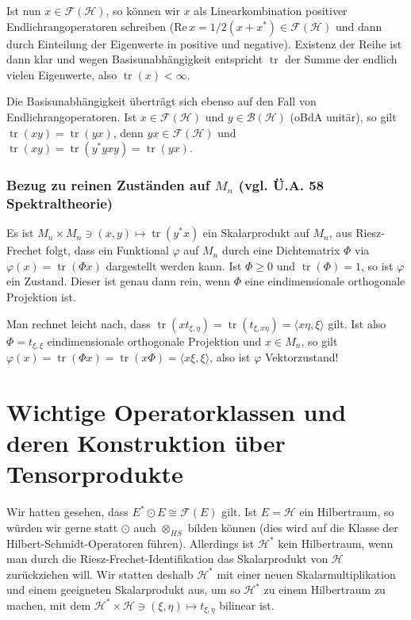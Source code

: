 \documentclass[11pt,a4paper]{scrartcl}
\newcommand{\Hc}{\mathcal{H}}
\newcommand{\B}{\mathcal{B}}
\newcommand{\F}{\mathcal{F}}
\renewcommand{\Re}{\mathrm{Re}\,}
\theoremstyle{plain}
\theoremstyle{definition}
\theoremstyle{remark}
\DeclareMathOperator{\tr}{tr}
\begin{document}
Ist nun $x\in \F(\Hc)$, so können wir $x$ als Linearkombination positiver Endlichrangoperatoren schreiben ($\Re x = 1/2(x+x^*) \in \F(\Hc)$ und dann durch Einteilung der Eigenwerte in positive und negative). Existenz der Reihe ist dann klar und wegen Basisunabhängigkeit entspricht $\tr$ der Summe der endlich vielen Eigenwerte, also $\tr(x) < \infty$.

Die Basisunabhängigkeit überträgt sich ebenso auf den Fall von Endlichrangoperatoren. Ist $x\in \F(\Hc)$ und $y\in \B(\Hc)$ (oBdA unitär), so gilt $\tr(xy)=\tr(yx)$, denn $yx\in \F(\Hc)$ und $\tr(xy)=\tr(y^*yxy)=\tr(yx)$.

\subsubsection{Bezug zu reinen Zuständen auf $M_n$ (vgl. Ü.A. 58 Spektraltheorie)}

Es ist $M_n\times M_n \ni (x,y) \mapsto \tr(y^*x)$ ein Skalarprodukt auf $M_n$, aus Riesz-Frechet folgt, dass ein Funktional $\varphi$ auf $M_n$ durch eine Dichtematrix $\Phi$ via $\varphi(x)=\tr(\Phi x)$ dargestellt werden kann. Ist $\Phi \geq 0$ und $\tr(\Phi)=1$, so ist $\varphi$ ein Zustand. Dieser ist genau dann rein, wenn $\Phi$ eine eindimensionale orthogonale Projektion ist.

Man rechnet leicht nach, dass $\tr(x t_{\xi,\eta})=\tr(t_{\xi,x\eta})=\langle x\eta, \xi \rangle$ gilt. Ist also $\Phi=t_{\xi,\xi}$ eindimensionale orthogonale Projektion und $x\in M_n$, so gilt $\varphi(x)=\tr(\Phi x)=\tr(x \Phi)=\langle x\xi, \xi \rangle$, also ist $\varphi$ Vektorzustand!

\section{Wichtige Operatorklassen und deren Konstruktion über Tensorprodukte}

Wir hatten gesehen, dass $E^*\odot E \cong \F(E)$ gilt. Ist $E=\Hc$ ein Hilbertraum, so würden wir gerne statt $\odot$ auch $\otimes_{HS}$ bilden können (dies wird auf die Klasse der Hilbert-Schmidt-Operatoren führen). Allerdings ist $\Hc^*$ kein Hilbertraum, wenn man durch die Riesz-Frechet-Identifikation das Skalarprodukt von $\Hc$ zurückziehen will. Wir statten deshalb $\Hc^*$ mit einer neuen Skalarmultiplikation und einem geeigneten Skalarprodukt aus, um so $\Hc^*$ zu einem Hilbertraum zu machen, mit dem $\Hc^*\times \Hc \ni (\xi,\eta) \mapsto t_{\xi,\eta}$ bilinear ist.
\end{document}
